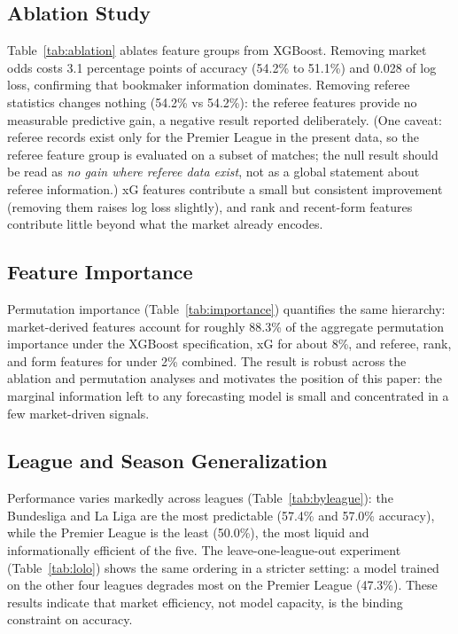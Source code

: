 \subsection{Ablation Study}


Table~\ref{tab:ablation} ablates feature groups from XGBoost. Removing
market odds costs 3.1 percentage points of accuracy (54.2\% to
51.1\%) and 0.028 of log loss, confirming that bookmaker information
dominates. Removing referee statistics changes nothing (54.2\% vs
54.2\%): the referee features provide no measurable predictive gain,
a negative result reported deliberately. (One caveat: referee
records exist only for the Premier League in the present data, so the referee
feature group is evaluated on a subset of matches; the null result
should be read as \emph{no gain where referee data exist}, not as a
global statement about referee information.) xG features contribute a
small but consistent improvement (removing them raises log loss
slightly), and rank and recent-form features contribute little beyond
what the market already encodes.

\subsection{Feature Importance}


Permutation importance (Table~\ref{tab:importance}) quantifies the
same hierarchy: market-derived features account for roughly 88.3\% of
the aggregate permutation importance under the XGBoost specification,
xG for about 8\%, and referee,
rank, and form features for under 2\% combined. The result is robust
across the ablation and permutation analyses and motivates the
position of this paper: the marginal information left to any
forecasting model is small and concentrated in a few market-driven
signals.

\subsection{League and Season Generalization}



Performance varies markedly across leagues (Table~\ref{tab:byleague}):
the Bundesliga and La Liga are the most predictable (57.4\% and
57.0\% accuracy), while the Premier League is the least (50.0\%), the
most liquid and informationally efficient of the five. The
leave-one-league-out experiment (Table~\ref{tab:lolo}) shows the same
ordering in a stricter setting: a model trained on the other four
leagues degrades most on the Premier League (47.3\%). These results
indicate that market efficiency, not model capacity, is the binding
constraint on accuracy.

